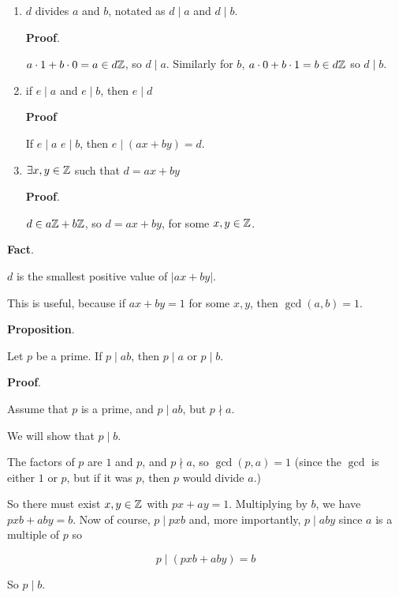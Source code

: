 \documentclass[12pt]{article}
\begin{document}
\begin{enumerate}
	\item $d$ divides $a$ and $b$, notated as $d \mid a$ and $d \mid b$.

		      {\bf Proof}.

	      $a \cdot 1 + b \cdot 0 = a \in d{\mathbb Z}$, so $d \mid a$. Similarly for $b$, $a \cdot
		      0 + b \cdot 1 = b \in d{\mathbb Z}$ so $d \mid b$.

	\item if $e \mid a$ and $e \mid b$, then $e \mid d$

	      {\bf Proof}

	      If $e \mid a$ $e \mid b$, then $e \mid (ax + by) = d$.

	\item $\exists x, y \in {\mathbb Z}$ such that $d = ax + by$

	      {\bf Proof}.

	      $d \in a{\mathbb Z} + b{\mathbb Z}$, so $d = ax + by$, for some $x, y \in {\mathbb Z}$.
\end{enumerate}

{\bf Fact}.

$d$ is the smallest positive value of $|ax + by|$.

This is useful, because if $ax + by = 1$ for some $x, y$, then $\gcd(a, b) = 1$.


{\bf Proposition}.

Let $p$ be a prime. If $p \mid ab$, then $p \mid a$ or $p \mid b$.

	{\bf Proof}.

Assume that $p$ is a prime, and $p \mid ab$, but $p \nmid a$.

We will show that $p \mid b$.

The factors of $p$ are $1$ and $p$, and $p \nmid a$, so $\gcd(p, a) = 1$ (since
the $\gcd$ is either $1$ or $p$, but if it was $p$, then $p$ would divide $a$.)

So there must exist $x, y \in {\mathbb Z}$ with $px + ay = 1$. Multiplying by $b$, we
have $pxb + aby = b$. Now of course, $p \mid pxb$ and, more importantly, $p \mid aby$
since $a$ is a multiple of $p$ so

\[
	p \mid (pxb + aby) = b
\]

So $p \mid b$.
\end{document}
